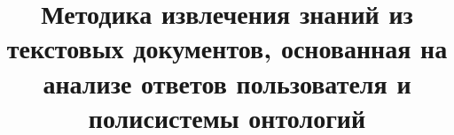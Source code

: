 \documentclass[conference]{IEEEtran}
\begin{document}
%
\title{Методика извлечения знаний из текстовых документов, основанная на анализе ответов пользователя и полисистемы онтологий}



\end{document}
